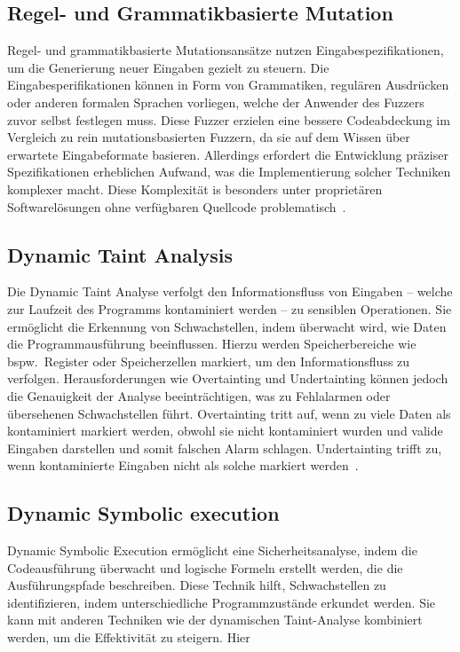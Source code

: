 \subsection{Regel- und Grammatikbasierte Mutation}\label{subsec:regelbasierte-muataion-und-grammatik}
Regel- und grammatikbasierte Mutationsansätze nutzen Eingabespezifikationen, um die Generierung neuer Eingaben gezielt
zu steuern.
Die Eingabesperifikationen können in Form von Grammatiken, regulären Ausdrücken oder anderen formalen Sprachen vorliegen,
welche der Anwender des Fuzzers zuvor selbst festlegen muss.
Diese Fuzzer erzielen eine bessere Codeabdeckung im Vergleich zu rein mutationsbasierten Fuzzern, da sie auf dem Wissen
über erwartete Eingabeformate basieren.
Allerdings erfordert die Entwicklung präziser Spezifikationen erheblichen Aufwand, was die Implementierung solcher Techniken
komplexer macht.
Diese Komplexität is besonders unter proprietären Softwarelösungen ohne verfügbaren Quellcode problematisch~\cite{eceiza_fuzzing_2021}.
\subsection{Dynamic Taint Analysis}\label{subsec:dynamic-taint-analysis}
Die Dynamic Taint Analyse verfolgt den Informationsfluss von Eingaben -- welche zur Laufzeit des Programms kontaminiert
werden -- zu sensiblen Operationen.
Sie ermöglicht die Erkennung von Schwachstellen, indem überwacht wird, wie Daten die Programmausführung beeinflussen.
Hierzu werden Speicherbereiche wie bspw.\ Register oder Speicherzellen markiert, um den Informationsfluss zu verfolgen.
Herausforderungen wie Overtainting und Undertainting können jedoch die Genauigkeit der Analyse beeinträchtigen, was zu
Fehlalarmen oder übersehenen Schwachstellen führt.
Overtainting tritt auf, wenn zu viele Daten als kontaminiert markiert werden, obwohl sie nicht kontaminiert wurden und
valide Eingaben darstellen und somit falschen Alarm schlagen.
Undertainting trifft zu, wenn kontaminierte Eingaben nicht als solche markiert werden~\cite{schwartz_all_2010}.
\subsection{Dynamic Symbolic execution}\label{subsec:dynamic-symbolic-execution}
Dynamic Symbolic Execution ermöglicht eine Sicherheitsanalyse, indem die Codeausführung überwacht und logische Formeln
erstellt werden, die die Ausführungspfade beschreiben.
Diese Technik hilft, Schwachstellen zu identifizieren, indem unterschiedliche Programmzustände erkundet werden.
Sie kann mit anderen Techniken wie der dynamischen Taint-Analyse kombiniert werden, um die Effektivität zu steigern.
Hier~\cite{schwartz_all_2010}
